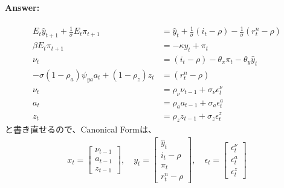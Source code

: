 \documentclass[a4j, dvipdfmx]{jarticle}
\begin{document}
\paragraph{Answer:}
\begin{align}
E_t\hat{y}_{t+1} + \frac{1}{\sigma}E_t\pi_{t+1} &= \hat{y}_t + \frac{1}{\sigma}(i_t - \rho) - \frac{1}{\sigma} (r^n_t - \rho) \\
\beta E_t\pi_{t+1} &= -\kappa y_t + \pi_t\\
\nu_t &= (i_t - \rho) - \theta_\pi \pi_t - \theta_y \hat{y}_t\\
-\sigma(1-\rho_a)\psi_{ya} a_t + (1-\rho_z)z_t &= (r^n_t - \rho)\\
\nu_t &= \rho_\nu \nu_{t-1} + \sigma_\nu \epsilon^\nu_t\\
a_t &= \rho_a a_{t-1} + \sigma_a \epsilon^a_t\\
z_t &= \rho_z z_{t-1} + \sigma_z \epsilon^z_t
\end{align}
と書き直せるので、Canonical Formは、
\begin{align}
x_t = \begin{bmatrix} \nu_{t-1} \\ a_{t-1} \\ z_{t-1} \end{bmatrix}, \quad y_t = \begin{bmatrix}\hat{y}_t \\ i_t - \rho \\ \pi_t \\ r^n_t - \rho\end{bmatrix}, \quad \epsilon_t = \begin{bmatrix}\epsilon^\nu_t \\ \epsilon^a_t \\ \epsilon^z_t\end{bmatrix}
\end{align}
\end{document}
